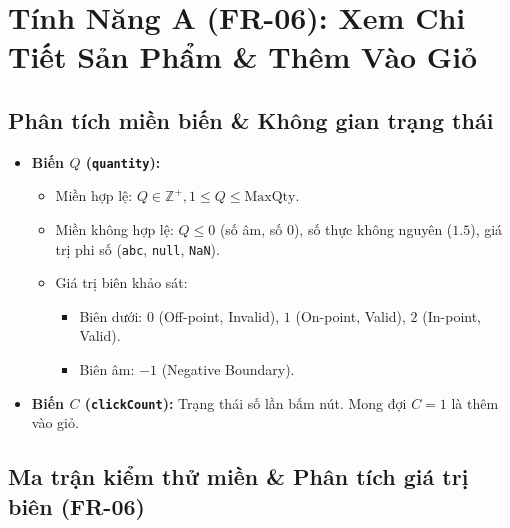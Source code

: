 \documentclass[11pt,a4paper]{article}
\begin{document}
\section{Tính Năng A (FR-06): Xem Chi Tiết Sản Phẩm \& Thêm Vào Giỏ}

\subsection{Phân tích miền biến \& Không gian trạng thái}
\begin{itemize}
    \item \textbf{Biến $Q$ (\texttt{quantity}):}
    \begin{itemize}
        \item Miền hợp lệ: $Q \in \mathbb{Z}^+, 1 \le Q \le \text{MaxQty}$.
        \item Miền không hợp lệ: $Q \le 0$ (số âm, số 0), số thực không nguyên ($1.5$), giá trị phi số (\texttt{abc}, \texttt{null}, \texttt{NaN}).
        \item Giá trị biên khảo sát:
        \begin{itemize}
            \item Biên dưới: $0$ (Off-point, Invalid), $1$ (On-point, Valid), $2$ (In-point, Valid).
            \item Biên âm: $-1$ (Negative Boundary).
        \end{itemize}
    \end{itemize}
    \item \textbf{Biến $C$ (\texttt{clickCount}):} Trạng thái số lần bấm nút. Mong đợi $C=1$ là thêm vào giỏ.
\end{itemize}

\subsection{Ma trận kiểm thử miền \& Phân tích giá trị biên (FR-06)}
\end{document}
